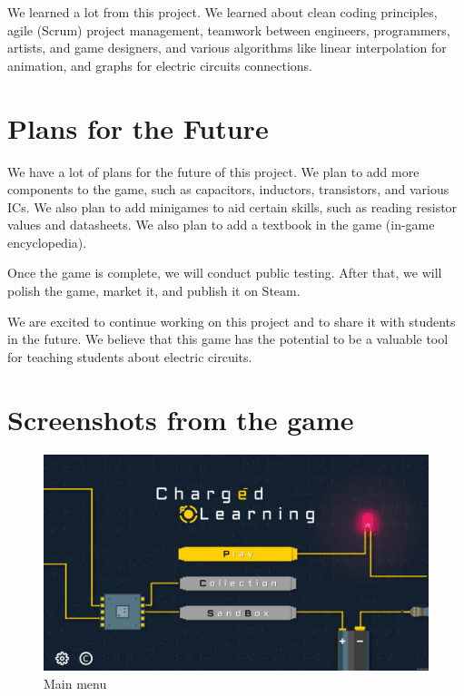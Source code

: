 \documentclass[../main.tex]{subfiles}
\begin{document}
We learned a lot from this project. We learned about clean coding principles, agile (Scrum) project management, teamwork between engineers, programmers, artists, and game designers, and various algorithms like linear interpolation for animation, and graphs for electric circuits connections.

\section{Plans for the Future}

We have a lot of plans for the future of this project. We plan to add more components to the game, such as capacitors, inductors, transistors, and various ICs. We also plan to add minigames to aid certain skills, such as reading resistor values and datasheets. We also plan to add a textbook in the game (in-game encyclopedia).

Once the game is complete, we will conduct public testing. After that, we will polish the game, market it, and publish it on Steam.

We are excited to continue working on this project and to share it with students in the future. We believe that this game has the potential to be a valuable tool for teaching students about electric circuits.

\newpage
\section{Screenshots from the game}
\begin{figure}[!ht]
    \centering
    \includegraphics[scale=0.3]{images/chapter5/main_menu.jpeg}
    \caption{Main menu}
    \label{main_menu}
\end{figure}
\end{document}
